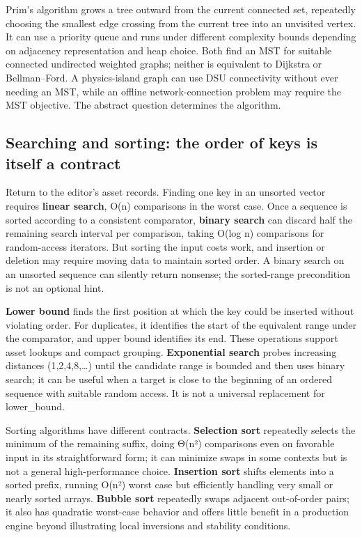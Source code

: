 Prim's algorithm grows a tree outward from the current connected set, repeatedly choosing the smallest edge crossing from the current tree into an unvisited vertex. It can use a priority queue and runs under different complexity bounds depending on adjacency representation and heap choice. Both find an MST for suitable connected undirected weighted graphs; neither is equivalent to Dijkstra or Bellman--Ford. A physics-island graph can use DSU connectivity without ever needing an MST, while an offline network-connection problem may require the MST objective. The abstract question determines the algorithm.

\subsection{Searching and sorting: the order of keys is itself a contract}\label{01-foundations-i-ch008-searching-and-sorting-the-order-of-keys-is-itself-a-contract}

\hypertarget{01-foundations-i-ch008-searching-and-sorting-the-order-of-keys-is-itself-a-contract}{}

Return to the editor's asset records. Finding one key in an unsorted vector requires \textbf{linear search}, O(n) comparisons in the worst case. Once a sequence is sorted according to a consistent comparator, \textbf{binary search} can discard half the remaining search interval per comparison, taking O(log n) comparisons for random-access iterators. But sorting the input costs work, and insertion or deletion may require moving data to maintain sorted order. A binary search on an unsorted sequence can silently return nonsense; the sorted-range precondition is not an optional hint.

\textbf{Lower bound} finds the first position at which the key could be inserted without violating order. For duplicates, it identifies the start of the equivalent range under the comparator, and upper bound identifies its end. These operations support asset lookups and compact grouping. \textbf{Exponential search} probes increasing distances (1,2,4,8,\ldots) until the candidate range is bounded and then uses binary search; it can be useful when a target is close to the beginning of an ordered sequence with suitable random access. It is not a universal replacement for lower\_bound.

Sorting algorithms have different contracts. \textbf{Selection sort} repeatedly selects the minimum of the remaining suffix, doing Θ(n²) comparisons even on favorable input in its straightforward form; it can minimize swaps in some contexts but is not a general high-performance choice. \textbf{Insertion sort} shifts elements into a sorted prefix, running O(n²) worst case but efficiently handling very small or nearly sorted arrays. \textbf{Bubble sort} repeatedly swaps adjacent out-of-order pairs; it also has quadratic worst-case behavior and offers little benefit in a production engine beyond illustrating local inversions and stability conditions.

